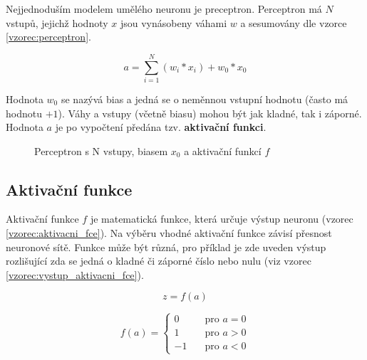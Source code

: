 Nejjednoduším modelem umělého neuronu je preceptron. Perceptron má $N$ vstupů, jejichž hodnoty $x$ jsou vynásobeny váhami $w$ a sesumovány dle vzorce \ref{vzorec:perceptron}.

\begin{equation} \label{vzorec:perceptron}
  a = \sum_{i=1}^{N} (w_i * x_i) + w_0 * x_0
\end{equation}

Hodnota $w_0$ se nazývá bias a jedná se o neměnnou vstupní hodnotu (často má hodnotu $+1$). Váhy a vstupy (včetně biasu) mohou být jak kladné, tak i záporné. Hodnota $a$ je po vypočtení předána tzv. \textbf{aktivační funkci}.

\begin{figure}[H]
  \begin{center}
  \label{obrazek:perceptron}
  \caption{Perceptron s N vstupy, biasem $x_0$ a aktivační funkcí $f$}
  \end{center}
\end{figure}

\subsection*{Aktivační funkce}
Aktivační funkce $f$ je matematická funkce, která určuje výstup neuronu (vzorec \ref{vzorec:aktivacni_fce}). Na výběru vhodné aktivační funkce závisí přesnost neuronové sítě. Funkce může být různá, pro příklad je zde uveden výstup rozlišující zda se jedná o kladné či záporné číslo nebo nulu (viz vzorec \ref{vzorec:vystup_aktivacni_fce}).

\begin{equation} \label{vzorec:aktivacni_fce}
  z = f(a)
\end{equation}

\begin{equation}
  \label{vzorec:vystup_aktivacni_fce}
   f(a) =
    \begin{cases}
      0       & \quad \text{pro } a = 0\\
      1       & \quad \text{pro } a > 0\\
      -1       & \quad \text{pro } a < 0
    \end{cases}
\end{equation}


